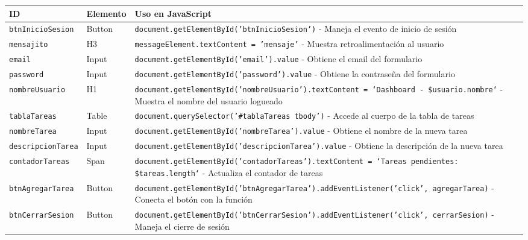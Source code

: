 \documentclass[12pt,a4paper]{article}
\begin{document}
\begin{longtable}{|p{4cm}|p{3cm}|p{8cm}|}
\hline
\rowcolor{lightgray}
\textbf{ID} & \textbf{Elemento} & \textbf{Uso en JavaScript} \\
\hline

\texttt{btnInicioSesion} & Button & \texttt{document.getElementById('btnInicioSesion')} - Maneja el evento de inicio de sesión \\
\hline

\texttt{mensajito} & H3 & \texttt{messageElement.textContent = 'mensaje'} - Muestra retroalimentación al usuario \\
\hline

\texttt{email} & Input & \texttt{document.getElementById('email').value} - Obtiene el email del formulario \\
\hline

\texttt{password} & Input & \texttt{document.getElementById('password').value} - Obtiene la contraseña del formulario \\
\hline

\texttt{nombreUsuario} & H1 & \texttt{document.getElementById('nombreUsuario').textContent = `Dashboard - \${usuario.nombre}`} - Muestra el nombre del usuario logueado \\
\hline

\texttt{tablaTareas} & Table & \texttt{document.querySelector('\#tablaTareas tbody')} - Accede al cuerpo de la tabla de tareas \\
\hline

\texttt{nombreTarea} & Input & \texttt{document.getElementById('nombreTarea').value} - Obtiene el nombre de la nueva tarea \\
\hline

\texttt{descripcionTarea} & Input & \texttt{document.getElementById('descripcionTarea').value} - Obtiene la descripción de la nueva tarea \\
\hline

\texttt{contadorTareas} & Span & \texttt{document.getElementById('contadorTareas').textContent = `Tareas pendientes: \${tareas.length}`} - Actualiza el contador de tareas \\
\hline

\texttt{btnAgregarTarea} & Button & \texttt{document.getElementById('btnAgregarTarea').addEventListener('click', agregarTarea)} - Conecta el botón con la función \\
\hline

\texttt{btnCerrarSesion} & Button & \texttt{document.getElementById('btnCerrarSesion').addEventListener('click', cerrarSesion)} - Maneja el cierre de sesión \\
\hline

\end{longtable}
\end{document}
